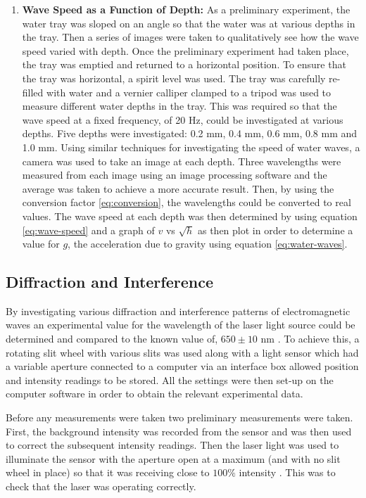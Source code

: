 \documentclass{article}
\begin{document}
\begin{enumerate}
  \item \textbf{Wave Speed as a Function of Depth:} As a preliminary experiment, the water tray was sloped on an angle so that the water was at various depths in the tray. Then a series of images were taken to qualitatively see how the wave speed varied with depth. Once the preliminary experiment had taken place, the tray was emptied and returned to a horizontal position. To ensure that the tray was horizontal, a spirit level was used. The tray was carefully re-filled with water and a vernier calliper clamped to a tripod was used to measure different water depths in the tray. This was required so that the wave speed at a fixed frequency, of 20 Hz, could be investigated at various depths. Five depths were investigated: 0.2 mm, 0.4 mm, 0.6 mm, 0.8 mm and 1.0 mm. Using similar techniques for investigating the speed of water waves, a camera was used to take an image at each depth. Three wavelengths were measured from each image using an image processing software and the average was taken to achieve a more accurate result. Then, by using the conversion factor \eqref{eq:conversion}, the wavelengths could be converted to real values. The wave speed at each depth was then determined by using equation \eqref{eq:wave-speed} and a graph of $v$ vs $\sqrt{h}$ as then plot in order to determine a value for $g$, the acceleration due to gravity using equation \eqref{eq:water-waves}.
\end{enumerate}

\subsection{Diffraction and Interference}
\label{ssec:diffraction-method}

By investigating various diffraction and interference patterns of electromagnetic waves an experimental value for the wavelength of the laser light source could be determined and compared to the known value of, $650 \pm 10$ nm \cite{Web02}. To achieve this, a rotating slit wheel with various slits was used along with a light sensor which had a variable aperture connected to a computer via an interface box allowed position and intensity readings to be stored. All the settings were then set-up on the computer software in order to obtain the relevant experimental data. 

\vspace{2mm}
\noindent
Before any measurements were taken two preliminary measurements were taken. First, the background intensity was recorded from the sensor and was then used to correct the subsequent intensity readings. Then the laser light was used to illuminate the sensor with the aperture open at a maximum (and with no slit wheel in place) so that it was receiving close to $100\%$ intensity \cite{Paper01}. This was to check that the laser was operating correctly.
\end{document}
